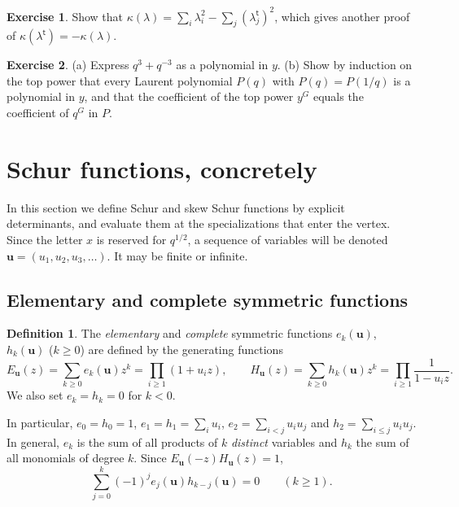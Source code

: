 \documentclass[11pt]{article}
\theoremstyle{plain}
\theoremstyle{definition}
\newtheorem{definition}[theorem]{Definition}
\newtheorem{exercise}{Exercise}[section]
\theoremstyle{remark}
\newcommand{\vu}{\mathbf{u}}
\newcommand{\tr}{{\mathsf t}}
\newcommand{\lt}[1]{#1^{\tr}}
\begin{document}
\begin{exercise}\label{ex:part2}
Show that $\kappa(\lambda)=\sum_i\lambda_i^2-\sum_j(\lt\lambda_j)^2$, which gives another proof
of $\kappa(\lt\lambda)=-\kappa(\lambda)$.
\end{exercise}

\begin{exercise}\label{ex:ypoly}
(a) Express $q^3+q^{-3}$ as a polynomial in $y$. (b) Show by induction on the top power that
every Laurent polynomial $P(q)$ with $P(q)=P(1/q)$ is a polynomial in $y$, and that the
coefficient of the top power $y^G$ equals the coefficient of $q^G$ in $P$.
\end{exercise}

\section{Schur functions, concretely}\label{sec:schur}

In this section we define Schur and skew Schur functions by explicit determinants, and
evaluate them at the specializations that enter the vertex. Since the letter $x$ is reserved for
$q^{1/2}$, a sequence of variables will be denoted $\vu=(u_1,u_2,u_3,\ldots)$. It may be finite
or infinite.

\subsection{Elementary and complete symmetric functions}

\begin{definition}
The \textit{elementary} and \textit{complete} symmetric functions $e_k(\vu)$, $h_k(\vu)$
($k\ge0$) are defined by the generating functions
\begin{equation}\label{eq:EH}
E_\vu(z)=\sum_{k\ge0}e_k(\vu)z^k=\prod_{i\ge1}(1+u_iz),\qquad
H_\vu(z)=\sum_{k\ge0}h_k(\vu)z^k=\prod_{i\ge1}\frac1{1-u_iz}.
\end{equation}
We also set $e_k=h_k=0$ for $k<0$.
\end{definition}

In particular, $e_0=h_0=1$, $e_1=h_1=\sum_iu_i$, $e_2=\sum_{i<j}u_iu_j$ and $h_2=\sum_{i\le j}u_iu_j$. In
general, $e_k$ is the sum of all products of $k$ \textit{distinct} variables and $h_k$ the sum of
all monomials of degree $k$. Since $E_\vu(-z)H_\vu(z)=1$,
\begin{equation}\label{eq:EHrel}
\sum_{j=0}^k(-1)^je_j(\vu)h_{k-j}(\vu)=0\qquad(k\ge1).
\end{equation}
\end{document}
